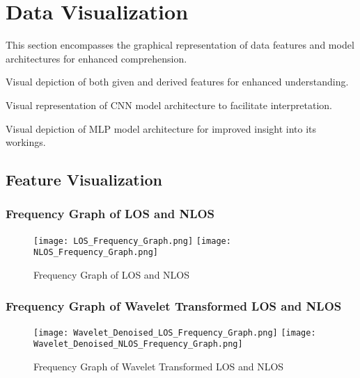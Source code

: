 \documentclass[
	article, %
	11pt, %
]{CSUniSchoolLabReport}
\begin{document}


\section{Data Visualization}\label{data_visualisation}

This section encompasses the graphical representation of data features and model architectures for enhanced comprehension.

\begin{description}[style=nextline]
    \item[Feature Visualization:] Visual depiction of both given and derived features for enhanced understanding.
    \item[Convolution Neural Network:] Visual representation of CNN model architecture to facilitate interpretation.
    \item[Multilayer Perceptron:] Visual depiction of MLP model architecture for improved insight into its workings.
\end{description}

\subsection{Feature Visualization}\label{feature_visualization}

\subsubsection{Frequency Graph of LOS and NLOS}\label{frequency_graph}

\begin{figure}[H] 
	\centering
	\texttt{[image: LOS\_Frequency\_Graph.png]}
	\texttt{[image: NLOS\_Frequency\_Graph.png]}
	\caption{Frequency Graph of LOS and NLOS}\label{fig:frequency_graph}
\end{figure}

\subsubsection{Frequency Graph of Wavelet Transformed LOS and NLOS}\label{frequency_graph_wavelet}

\begin{figure}[H] 
  \centering
  \texttt{[image: Wavelet\_Denoised\_LOS\_Frequency\_Graph.png]}
  \texttt{[image: Wavelet\_Denoised\_NLOS\_Frequency\_Graph.png]}
  \caption{Frequency Graph of Wavelet Transformed LOS and NLOS}\label{fig:frequency_graph_wavelet}
\end{figure}
\end{document}

